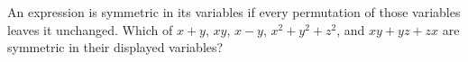 An expression is symmetric in its variables if every permutation of those variables leaves it unchanged. Which of $x+y$, $xy$, $x-y$, $x^2+y^2+z^2$, and $xy+yz+zx$ are symmetric in their displayed variables?
